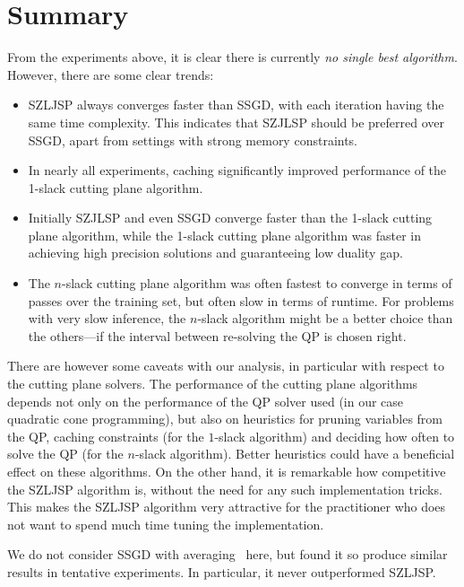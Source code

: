 \section{Summary}
From the experiments above, it is clear there is currently \emph{no single best algorithm}.
However, there are some clear trends:
\begin{itemize}
    \item SZLJSP always converges faster than SSGD, with each iteration having
        the same time complexity.  This indicates that SZJLSP should be
        preferred over SSGD, apart from settings with strong memory
        constraints.
    \item In nearly all experiments, caching significantly improved performance
        of the 1-slack cutting plane algorithm.
    \item Initially SZJLSP and even SSGD converge faster than the 1-slack
        cutting plane algorithm, while the 1-slack cutting plane algorithm was
        faster in achieving high precision solutions and guaranteeing low
        duality gap.
    \item The $n$-slack cutting plane algorithm was often fastest to converge in
        terms of passes over the training set, but often slow in terms of
        runtime. For problems with very slow inference, the $n$-slack algorithm
        might be a better choice than the others---if the interval between re-solving
        the QP is chosen right.
\end{itemize}
There are however some caveats with our analysis, in particular with respect to
the cutting plane solvers. The performance of the cutting plane algorithms
depends not only on the performance of the QP solver used (in our case
quadratic cone programming), but also on heuristics for pruning variables from
the QP, caching constraints (for the $1$-slack algorithm) and deciding how
often to solve the QP (for the $n$-slack algorithm). Better heuristics could
have a beneficial effect on these algorithms. On the other hand, it is
remarkable how competitive the SZLJSP algorithm is, without the need for any
such implementation tricks. This makes the SZLJSP algorithm very attractive for
the practitioner who does not want to spend much time tuning the
implementation.

We do not consider SSGD with averaging~\cite{lacoste2012simpler} here, but
found it so produce similar results in tentative experiments. In particular, it
never outperformed SZLJSP.

